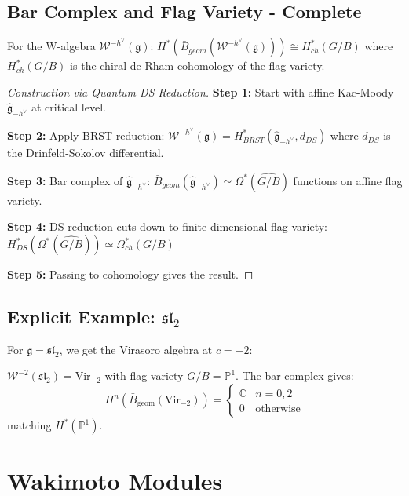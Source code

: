 \subsection{Bar Complex and Flag Variety - Complete}

\begin{theorem}
For the W-algebra $\mathcal{W}^{-h^\vee}(\mathfrak{g})$:
$H^*(\bar{B}_{geom}(\mathcal{W}^{-h^\vee}(\mathfrak{g}))) \cong H^*_{ch}(G/B)$
where $H^*_{ch}(G/B)$ is the chiral de Rham cohomology of the flag variety.
\end{theorem}

\begin{proof}[Construction via Quantum DS Reduction]
\textbf{Step 1:} Start with affine Kac-Moody $\hat{\mathfrak{g}}_{-h^\vee}$ at critical level.

\textbf{Step 2:} Apply BRST reduction:
$\mathcal{W}^{-h^\vee}(\mathfrak{g}) = H^*_{BRST}(\hat{\mathfrak{g}}_{-h^\vee}, d_{DS})$
where $d_{DS}$ is the Drinfeld-Sokolov differential.

\textbf{Step 3:} Bar complex of $\hat{\mathfrak{g}}_{-h^\vee}$:
$\bar{B}_{geom}(\hat{\mathfrak{g}}_{-h^\vee}) \simeq \Omega^*(\widehat{G/B})$
functions on affine flag variety.

\textbf{Step 4:} DS reduction cuts down to finite-dimensional flag variety:
$H^*_{DS}(\Omega^*(\widehat{G/B})) \simeq \Omega^*_{ch}(G/B)$

\textbf{Step 5:} Passing to cohomology gives the result.
\end{proof}
 
\subsection{Explicit Example: $\mathfrak{sl}_2$}
 
For $\mathfrak{g} = \mathfrak{sl}_2$, we get the Virasoro algebra at $c = -2$:
 
\begin{proposition}
$\mathcal{W}^{-2}(\mathfrak{sl}_2) = \text{Vir}_{-2}$ with flag variety $G/B = \mathbb{P}^1$. The bar complex gives:
\[
H^n(\bar{B}_{\text{geom}}(\text{Vir}_{-2})) = 
\begin{cases}
\mathbb{C} & n = 0, 2 \\
0 & \text{otherwise}
\end{cases}
\]
matching $H^*(\mathbb{P}^1)$.
\end{proposition}
 
\section{Wakimoto Modules}
 
